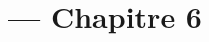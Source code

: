 
\title{\TSwiftTitle{} --- Chapitre 6}

\newcommand{\TSwiftRoot}[0]{../..} %



\maketitle

\tableofcontents




